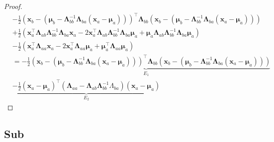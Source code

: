 \begin{appendices}
\begin{proof}
    \begin{equation*}
    \begin{aligned} &-\frac{1}{2}\left(\mathbf{x}_{b}-\left(\boldsymbol{\mu}_{b}-\boldsymbol{\Lambda}_{b b}^{-1} \boldsymbol{\Lambda}_{b a}\left(\mathbf{x}_{a}-\boldsymbol{\mu}_{a}\right)\right)\right)^\top \boldsymbol{\Lambda}_{b b}\left(\mathbf{x}_{b}-\left(\boldsymbol{\mu}_{b}-\boldsymbol{\Lambda}_{b b}^{-1} \boldsymbol{\Lambda}_{b a}\left(\mathbf{x}_{a}-\boldsymbol{\mu}_{a}\right)\right)\right) \\ &+\frac{1}{2}\left(\mathbf{x}_{a}^\top \boldsymbol{\Lambda}_{a b} \boldsymbol{\Lambda}_{b b}^{-1} \boldsymbol{\Lambda}_{b a} \mathbf{x}_{a}-2\mathbf{x}_{a}^\top \boldsymbol{\Lambda}_{a b} \boldsymbol{\Lambda}_{b b}^{-1} \boldsymbol{\Lambda}_{b a} \boldsymbol{\mu}_{a}+\boldsymbol{\mu}_{a} \boldsymbol{\Lambda}_{a b} \boldsymbol{\Lambda}_{b b}^{-1} \boldsymbol{\Lambda}_{b a} \boldsymbol{\mu}_{a}\right) \\ &-\frac{1}{2}\left(\mathbf{x}_{a}^\top \boldsymbol{\Lambda}_{a a} \mathbf{x}_{a}-2 \mathbf{x}_{a}^\top \boldsymbol{\Lambda}_{a a} \boldsymbol{\mu}_{a}+\boldsymbol{\mu}_{a}^\top \boldsymbol{\Lambda}_{a a} \boldsymbol{\mu}_{a}\right) \\ &=\underbrace{-\frac{1}{2}\left(\mathbf{x}_{b}-\left(\boldsymbol{\mu}_{b}-\boldsymbol{\Lambda}_{b b}^{-1} \boldsymbol{\Lambda}_{b a}\left(\mathbf{x}_{a}-\boldsymbol{\mu}_{a}\right)\right)\right)^\top \boldsymbol{\Lambda}_{b b}\left(\mathbf{x}_{b}-\left(\boldsymbol{\mu}_{b}-\boldsymbol{\Lambda}_{b b}^{-1} \boldsymbol{\Lambda}_{b a}\left(\mathbf{x}_{a}-\boldsymbol{\mu}_{a}\right)\right)\right)}_{E_1} \\ &\underbrace{-\frac{1}{2}\left(\mathbf{x}_{a}-\boldsymbol{\mu}_{a}\right)^\top\left(\boldsymbol{\Lambda}_{a a}-\boldsymbol{\Lambda}_{a b} \boldsymbol{\Lambda}_{b b}^{-1} \Lambda_{b a}\right)\left(\mathbf{x}_{a}-\boldsymbol{\mu}_{a}\right)}_{E_2} \end{aligned}
    \end{equation*}
  \end{proof}
  
  

  \subsection{Sub}

\end{appendices}